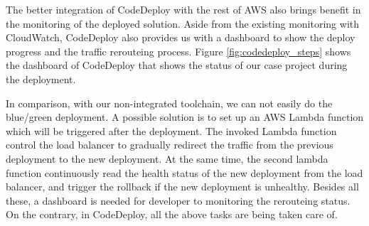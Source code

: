 \par
The better integration of CodeDeploy with the rest of AWS also brings benefit in the monitoring of the deployed solution. Aside from the existing monitoring with CloudWatch, CodeDeploy also provides us with a dashboard to show the deploy progress and the traffic rerouteing process. Figure \ref{fig:codedeploy_steps} shows the dashboard of CodeDeploy that shows the status of our case project during the deployment.
\par
In comparison, with our non-integrated toolchain, we can not easily do the blue/green deployment. A possible solution is to set up an AWS Lambda function which will be triggered after the deployment. The invoked Lambda function control the load balancer to gradually redirect the traffic from the previous deployment to the new deployment. At the same time, the second lambda function continuously read the health status of the new deployment from the load balancer, and trigger the rollback if the new deployment is unhealthy. Besides all these, a dashboard is needed for developer to monitoring the rerouteing status. On the contrary, in CodeDeploy, all the above tasks are being taken care of.

